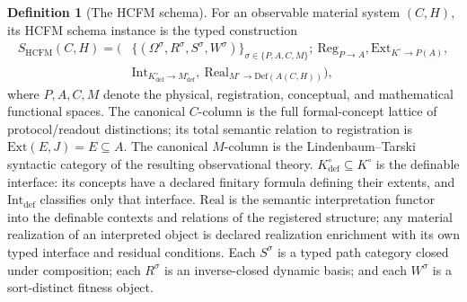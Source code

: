 \documentclass[11pt]{article}
\theoremstyle{definition}
\newtheorem{definition}{Definition}
\begin{document}
\begin{definition}[The HCFM schema]
For an observable material system $(C, H)$, its HCFM schema instance is the typed construction
\begin{equation}
\begin{aligned}
S_{\mathrm{HCFM}}(C, H) = \big(&\{(\Omega^{\sigma}, R^{\sigma}, S^{\sigma}, W^{\sigma})\}_{\sigma \in \{P,A,C,M\}};\ \mathrm{Reg}_{P \to A}, \mathrm{Ext}_{K^{\circ} \to P(A)},\\
&\mathrm{Int}_{K^{\circ}_{\mathrm{def}} \to M^{\circ}_{\mathrm{def}}},\ \mathrm{Real}_{M^{\circ} \to \mathrm{Def}(A(C,H))}\big),
\end{aligned}\tag{11}
\end{equation}
where $P, A, C, M$ denote the physical, registration, conceptual, and mathematical functional spaces. The canonical $C$-column is the full formal-concept lattice of protocol/readout distinctions; its total semantic relation to registration is $\mathrm{Ext}(E, J) = E \subseteq A$. The canonical $M$-column is the Lindenbaum--Tarski syntactic category of the resulting observational theory. $K^{\circ}_{\mathrm{def}} \subseteq K^{\circ}$ is the definable interface: its concepts have a declared finitary formula defining their extents, and $\mathrm{Int}_{\mathrm{def}}$ classifies only that interface. $\mathrm{Real}$ is the semantic interpretation functor into the definable contexts and relations of the registered structure; any material realization of an interpreted object is declared realization enrichment with its own typed interface and residual conditions. Each $S^{\sigma}$ is a typed path category closed under composition; each $R^{\sigma}$ is an inverse-closed dynamic basis; and each $W^{\sigma}$ is a sort-distinct fitness object.
\end{definition}
\end{document}
